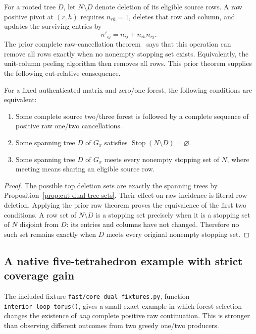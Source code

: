 For a rooted tree $D$, let $N\setminus D$ denote deletion of its eligible
source rows.  A raw positive pivot at $(r,h)$ requires $n_{rh}=1$, deletes
that row and column, and updates the surviving entries by
\[
 n'_{ij}=n_{ij}+n_{ih}n_{rj}.
\]
The prior complete raw-cancellation theorem~\cite{prior-stopping,prior-saturated} says that this operation can
remove all rows exactly when no nonempty stopping set exists.  Equivalently,
the unit-column peeling algorithm then removes all rows.  This prior
theorem supplies the following cut-relative consequence.

\begin{theorem}
\label{thm:cut-dual-stopping}
For a fixed authenticated matrix and zero/one forest, the following
conditions are equivalent:
\begin{enumerate}
 \item Some complete source two/three forest is followed by a complete
       sequence of positive raw one/two cancellations.
 \item Some spanning tree $D$ of $G_x$ satisfies
       $\operatorname{Stop}(N\setminus D)=\varnothing$.
 \item Some spanning tree $D$ of $G_x$ meets every nonempty stopping
       set of $N$, where meeting means sharing an eligible source row.
\end{enumerate}
\end{theorem}

\begin{proof}
The possible top deletion sets are exactly the spanning trees by
Proposition~\ref{prop:cut-dual-tree-sets}.  Their effect on raw incidence
is literal row deletion.  Applying the prior raw theorem proves the
equivalence of the first two conditions.  A row set of $N\setminus D$
is a stopping set precisely when it is a stopping set of $N$ disjoint
from $D$: its entries and columns have not changed.  Therefore no such
set remains exactly when $D$ meets every original nonempty stopping set.
\end{proof}

\subsection{A native five-tetrahedron example with strict coverage gain}
\label{subsec:cut-dual-native-example}

The included fixture
\texttt{fast/core\_dual\_fixtures.py}, function
\texttt{interior\_loop\_torus()}, gives a small exact example in which
forest selection changes the existence of \emph{any} complete positive
raw continuation.  This is stronger than observing different outcomes
from two greedy one/two producers.

